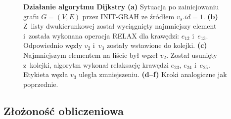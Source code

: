\begin{figure}[!h]
\begin{subfigure}[b]{0.3\textwidth}
		\caption{}
	\end{subfigure}
	\caption{\textbf{Działanie algorytmu Dijkstry} \textbf{(a)} Sytuacja po zainicjowaniu grafu $G = \left( V, E \right)$ przez \textsf{INIT-GRAH} ze źródłem $v_{s}.id = 1$. \textbf{(b)} Z~listy dwukierunkowej został wyciągnięty najmniejszy element i~została wykonana operacja \textsc{RELAX} dla krawędzi: $e_{12}$ i~$e_{13}$. Odpowiednio węzły $v_{2}$ i~$v_{3}$ zostały wstawione do kolejki. \textbf{(c)} Najmniejszym elementem na liście był węzeł $v_{2}$. Został usunięty z~kolejki, algorytm wykonał relaksację krawędzi $e_{23}$, $e_{24}$ i~$e_{25}$. Etykieta węzła $v_{3}$ uległa zmniejszeniu. \textbf{(d--f)} Kroki analogiczne jak poprzednie.} \label{fig:exapleDijkstraDLList}
\end{figure}

\subsection{Złożoność obliczeniowa}

